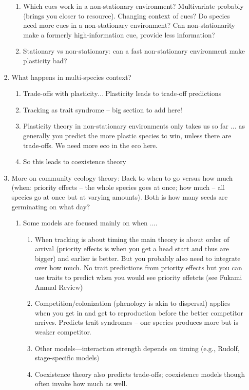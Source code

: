 \documentclass[11pt,letterpaper]{article}
\begin{document}
\begin{enumerate}
\begin{enumerate}
\item Which cues work in a non-stationary environment? Multivariate probably (brings you closer to resource). Changing context of cues? Do species need more cues in a non-stationary environment? Can non-stationarity make a formerly high-information cue, provide less information?
\item Stationary vs non-stationary: can a fast non-stationary environment make plasticity bad?
\end{enumerate}
\item What happens in multi-species context?
\begin{enumerate}
\item Trade-offs with plasticity... Plasticity leads to trade-off predictions
\item Tracking as trait syndrome -- big section to add here!
\item Plasticity theory in non-stationary environments only takes us so far ... as generally you predict the more plastic species to win, unless there are trade-offs. We need more eco in the eco here. 
\item So this leads to coexistence theory
\end{enumerate}
\item More on community ecology theory: Back to when to go versus how much (when: priority effects -- the whole species goes at once; how much -- all species go at once but at varying amounts). Both is how many seeds are germinating on what day?
\begin{enumerate}
\item Some models are focused mainly on when .... 
\begin{enumerate}
\item When tracking is about timing the main theory is about order of arrival (priority effects is when you get a head start and thus are bigger) and earlier is better. But you probably also need to integrate over how much. No trait predictions from priority effects but you can use traits to predict when you would see priority effetcts (see Fukami Annual Review)
\item Competition/colonization (phenology is akin to dispersal) applies when you get in and get to reproduction before the better competitor arrives. Predicts trait syndromes -- one species produces more but is weaker competitor. 
\item Other models---interaction strength depends on timing (e.g., Rudolf, stage-specific models) 
\item Coexistence theory also predicts trade-offs; coexistence models though often invoke how much as well. 

\end{enumerate}
\end{enumerate}
\end{enumerate}
\end{document}
